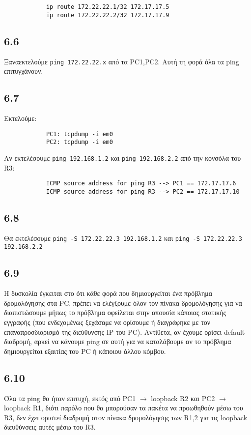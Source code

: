 \documentclass[a4paper, 12pt]{article}
\begin{document}
		\begin{verbatim}
			ip route 172.22.22.1/32 172.17.17.5
			ip route 172.22.22.2/32 172.17.17.9
		\end{verbatim}
		
	\subsection*{6.6}
		Ξαναεκτελούμε \verb|ping 172.22.22.x| από τα PC1,PC2. Αυτή τη φορά όλα τα ping επιτυγχάνουν.

	\subsection*{6.7} 
		Εκτελούμε:
		
		\begin{verbatim}
			PC1: tcpdump -i em0
			PC2: tcpdump -i em0
		\end{verbatim}
		
		Αν εκτελέσουμε \verb|ping 192.168.1.2| και \verb|ping 192.168.2.2| από την κονσόλα του R3:
		
		\begin{verbatim}
			ICMP source address for ping R3 --> PC1 == 172.17.17.6
			ICMP source address for ping R3 --> PC2 == 172.17.17.10
		\end{verbatim}

	\subsection*{6.8}
		Θα εκτελέσουμε \verb|ping -S 172.22.22.3 192.168.1.2| και \verb|ping -S 172.22.22.3 192.168.2.2|

	\subsection*{6.9}
		Η δυσκολία έγκειται στο ότι κάθε φορά που δημιουργείται ένα πρόβλημα δρομολόγησης στα PC, πρέπει να ελέγξουμε όλον τον πίνακα δρομολόγησης για να διαπιστώσουμε μήπως το πρόβλημα οφείλεται στην απουσία κάποιας στατικής εγγραφής (που ενδεχομένως ξεχάσαμε να ορίσουμε ή διαγράφηκε με τον επαναπροσδιορισμό της διεύθυνσης IP του PC). Αντίθετα, αν έχουμε ορίσει default διαδρομή, αρκεί να κάνουμε ping σε αυτή για να καταλάβουμε αν το πρόβλημα δημιουργείται εξαιτίας του PC ή κάποιου άλλου κόμβου.

	\subsection*{6.10}
 		Όλα τα ping θα ήταν επιτυχή, εκτός από PC1 $\rightarrow$ loopback R2 και PC2 $\rightarrow$ loopback R1, διότι παρόλο που θα μπορούσαν τα πακέτα να προωθηθούν μέσω του R3, δεν έχει οριστεί διαδρομή στον πίνακα δρομολόγησης των R1,2 για τις loopback διευθύνσεις αυτές μέσω του R3. 
\end{document}
